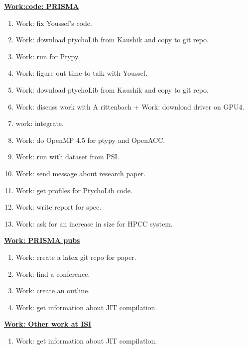 \begin{multicols}{4}
\begin{minipage}{\columnwidth}
\underline{\bf \tiny {Work:code: PRISMA}}
\begin{enumerate}
\item \tiny Work: fix Youssef's code.
\item \tiny Work: download ptychoLib from Kaushik and copy to git repo.
\item \tiny Work: run for Ptypy.
\item \tiny Work: figure out time to talk with Youssef.
\item \tiny Work: download ptychoLib from Kaushik and copy to git repo.

\item \tiny Work: discuss work with A rittenbach + Work: download
  driver on GPU4.

\item \tiny work: integrate.
\item \tiny Work: do OpenMP 4.5 for ptypy and OpenACC.
\item \tiny Work: run with dataset from PSI.
\item \tiny Work: send message about research paper.
\item \tiny Work: get profiles for PtychoLib code.
\item \tiny Work: write report for spec.
\item \tiny Work: ask for an increase in size for HPCC system.
\end{enumerate}
\end{minipage}

\begin{minipage}{\columnwidth}
\underline{\bf \tiny {Work: PRISMA pubs}}
\begin{enumerate}
\tiny \item \tiny Work: create a latex git repo for paper.
\item \tiny Work: find a conference.
\item \tiny Work: create an outline.
\item \tiny Work: get information about JIT compilation.
\end{enumerate}
\end{minipage}

\begin{minipage}{\columnwidth}
\underline{\bf \tiny {Work: Other work at ISI}}
\begin{enumerate}
\item \tiny Work: get information about JIT compilation.
\end{enumerate}
\end{minipage}


\end{multicols}
